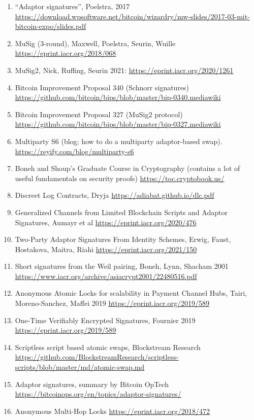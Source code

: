 \documentclass[10pt,a4paper]{article}
\providecommand{\tightlist}{%
  \setlength{\itemsep}{0pt}\setlength{\parskip}{0pt}}
\begin{document}
\begin{enumerate}
\def\labelenumi{\arabic{enumi}.}
\tightlist
\item
  \protect\hypertarget{anchor-1}{}{}``Adaptor signatures'', Poelstra, 2017
  \url{https://download.wpsoftware.net/bitcoin/wizardry/mw-slides/2017-03-mit-bitcoin-expo/slides.pdf}
\item
  \protect\hypertarget{anchor-2}{}{}MuSig (3-round), Maxwell, Poelstra, Seurin, Wuille
  \url{https://eprint.iacr.org/2018/068}
\item
  \protect\hypertarget{anchor-3}{}{}MuSig2, Nick, Ruffing, Seurin 2021:   \url{https://eprint.iacr.org/2020/1261} 
\item
  \protect\hypertarget{anchor-4}{}{}Bitcoin Improvement Proposal 340 (Schnorr signatures)
  \url{https://github.com/bitcoin/bips/blob/master/bip-0340.mediawiki}
\item
  \protect\hypertarget{anchor-5}{}{}Bitcoin Improvement Proposal 327 (MuSig2 protocol)
  \url{https://github.com/bitcoin/bips/blob/master/bip-0327.mediawiki}
\item
  \protect\hypertarget{anchor-6}{}{}Multiparty S6 (blog; how to do a multiparty adaptor-based swap).
  \url{https://reyify.com/blog/multiparty-s6}
\item
  \protect\hypertarget{anchor-7}{}{}Boneh and Shoup's Graduate Course in Cryptography (contains a lot of useful fundamentals on security proofs)
  \url{https://toc.cryptobook.us/}
\item
  \protect\hypertarget{anchor-8}{}{}Discreet Log Contracts, Dryja \url{https://adiabat.github.io/dlc.pdf}
\item
  \protect\hypertarget{anchor-9}{}{}Generalized Channels from Limited Blockchain Scripts and Adaptor Signatures, Aumayr et al
  \url{https://eprint.iacr.org/2020/476}
\item
  \protect\hypertarget{anchor-10}{}{}Two-Party Adaptor Signatures From Identity Schemes, Erwig, Faust, Hostakova, Maitra, Riahi
  \url{https://eprint.iacr.org/2021/150}
\item
  \protect\hypertarget{anchor-11}{}{}Short signatures from the Weil pairing, Boneh, Lynn, Shacham 2001
  \url{https://www.iacr.org/archive/asiacrypt2001/22480516.pdf}
\item
  \protect\hypertarget{anchor-12}{}{}Anonymous Atomic Locks for scalability in Payment Channel Hubs, Tairi, Moreno-Sanchez, Maffei 2019
  \url{https://eprint.iacr.org/2019/589}
\item
  \protect\hypertarget{anchor-13}{}{}One-Time Verifiably Encrypted Signatures, Fournier 2019
  \url{https://eprint.iacr.org/2019/589}
\item
  \protect\hypertarget{anchor-14}{}{}Scriptless script based atomic swaps, Blockstream Research
  \url{https://github.com/BlockstreamResearch/scriptless-scripts/blob/master/md/atomic-swap.md}
\item
  \protect\hypertarget{anchor-15}{}{}Adaptor signatures, summary by Bitcoin OpTech
  \url{https://bitcoinops.org/en/topics/adaptor-signatures/}
\item
  \protect\hypertarget{anchor-16}{}{}Anonymous Multi-Hop Locks
  \url{https://eprint.iacr.org/2018/472}
 
  
  
\end{enumerate}
\end{document}
